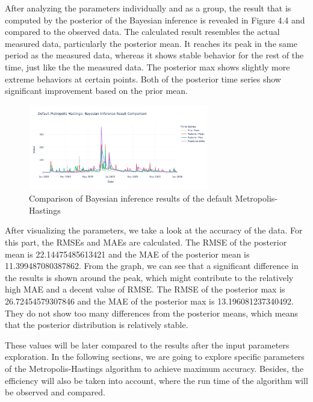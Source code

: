 After analyzing the parameters individually and as a group, the result that is computed by the posterior of the Bayesian inference is revealed in Figure 4.4 and compared to the observed data. The calculated result resembles the actual measured data, particularly the posterior mean. It reaches its peak in the same period as the measured data, whereas it shows stable behavior for the rest of the time, just like the the measured data. The posterior max shows slightly more extreme behaviors at certain points. Both of the posterior time series show significant improvement based on the prior mean. 


\begin{figure}[H]
    \centering
    \includegraphics[width=0.7\textwidth]{figures/basic_mh/default_mh/default_mh_bayes.png}
    \captionsetup{width=.8\textwidth}
    \caption{Comparison of Bayesian inference results of the default Metropolis-Hastings}
    \label{fig:enter-label}
\end{figure}

After visualizing the parameters, we take a look at the accuracy of the data. For this part, the RMSEs and MAEs are calculated. The RMSE of the posterior mean is 22.14475485613421 and the MAE of the posterior mean is 11.399487080387862. From the graph, we can see that a significant difference in the results is shown around the peak, which might contribute to the relatively high MAE and a decent value of RMSE. The RMSE of the posterior max is 26.72454579307846 and the MAE of the posterior max is 13.196081237340492. They do not show too many differences from the posterior means, which means that the posterior distribution is relatively stable. 

These values will be later compared to the results after the input parameters exploration. In the following sections, we are going to explore specific parameters of the Metropolis-Hastings algorithm to achieve maximum accuracy. Besides, the efficiency will also be taken into account, where the run time of the algorithm will be observed and compared.


